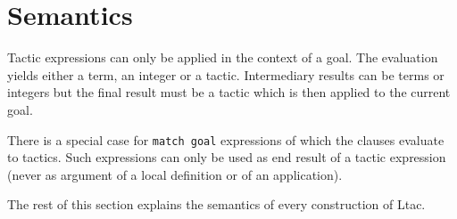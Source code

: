 \begin{table}[ht]
\noindent{}
\caption{Tactic toplevel definitions}
\label{ltactop}
\end{table}

\section{Semantics}

Tactic expressions can only be applied in the context of a goal.  The
evaluation yields either a term, an integer or a tactic. Intermediary
results can be terms or integers but the final result must be a tactic
which is then applied to the current goal.

There is a special case for {\tt match goal} expressions of which
the clauses evaluate to tactics. Such expressions can only be used as
end result of a tactic expression (never as argument of a local
definition or of an application).

The rest of this section explains the semantics of every construction
of Ltac.




